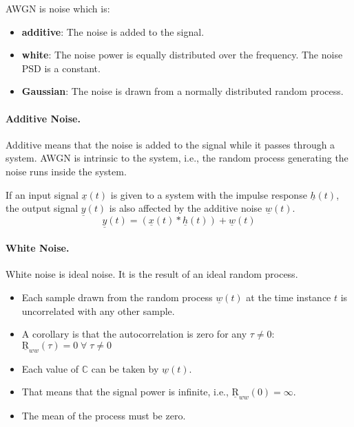 \begin{refsection}
 \ac{AWGN} is noise which is:
\begin{itemize}
	\item \textbf{additive}: The noise is added to the signal.
	\item \textbf{white}: The noise power is equally distributed over the frequency. The noise \ac{PSD} is a constant.
	\item \textbf{Gaussian}: The noise is drawn from a normally distributed random process.
\end{itemize}

\paragraph{Additive Noise.}

 Additive means that the noise is added to the signal while it passes through a system. \ac{AWGN} is intrinsic to the system, i.e., the random process generating the noise runs inside the system.

If an input signal $\underline{x}(t)$ is given to a system with the impulse response $\underline{h}(t)$, the output signal $\underline{y}(t)$ is also affected by the additive noise $\underline{w}(t)$.
\begin{equation}
	\underline{y}(t) = \left(\underline{x}(t) * \underline{h}(t)\right) + \underline{w}(t)
\end{equation}%

\paragraph{White Noise.}

 White noise is ideal noise. It is the result of an ideal random process.
\begin{itemize}
	\item Each sample drawn from the random process $\underline{w}(t)$ at the time instance $t$ is uncorrelated with any other sample.
	\item A corollary is that the autocorrelation is zero for any $\tau \neq 0$: $\underline{\mathrm{R}}_{ww}(\tau) = 0 \; \forall\; \tau \neq 0$
	\item Each value of $\mathbb{C}$ can be taken by $\underline{w}(t)$.
	\item That means that the signal power is infinite, i.e., $\underline{\mathrm{R}}_{ww}(0) = \infty$.
	\item The mean of the process must be zero.
\end{itemize}


\end{refsection}
